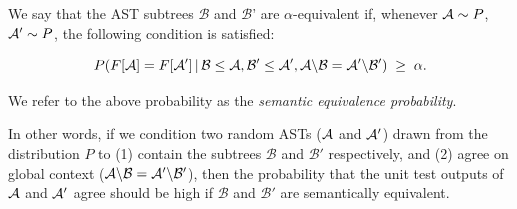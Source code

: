 
%


\begin{defn}\label{def:equivalence}
We say that the AST subtrees $\mathcal{B}$ and $\mathcal{B}$' are $\alpha$-equivalent if, whenever $\mathcal{A}\sim P$, $\mathcal{A}'\sim P$, the following condition is satisfied:

{\scriptsize
\begin{equation}\label{eqn:def1}
P(F[\mathcal{A}] = F[\mathcal{A}'] \,|\, \mathcal{B}\leq \mathcal{A}, \mathcal{B}' \leq \mathcal{A}', \mathcal{A}\backslash \mathcal{B} = \mathcal{A}'\backslash \mathcal{B}') \;\geq\; \alpha.
\end{equation}
}

We refer to the above probability as the \emph{semantic equivalence probability}.
\end{defn}
In other words, if we condition two random ASTs  ($\mathcal{A}$ and $\mathcal{A}'$) drawn from the distribution $P$ to (1) contain the subtrees
$\mathcal{B}$ and $\mathcal{B}'$ respectively, and (2) agree on global context ($\mathcal{A}\backslash \mathcal{B}=\mathcal{A}'\backslash \mathcal{B}'$), 
then the probability that the unit
test outputs of $\mathcal{A}$ and $\mathcal{A}'$ agree should be high if $\mathcal{B}$ and $\mathcal{B}'$ are semantically equivalent.




